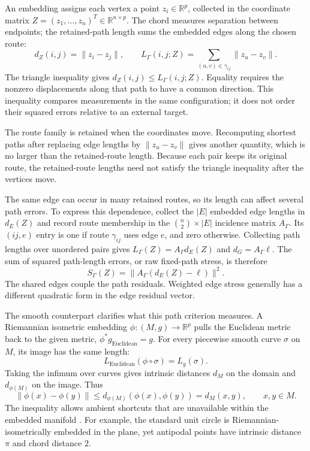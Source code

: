 \documentclass[11pt]{article}
\newcommand{\R}{\mathbb R}
\newcommand{\norm}[1]{\lVert#1\rVert}
\begin{document}
An embedding assigns each vertex a point $z_i\in\R^p$, collected in the
coordinate matrix $Z=(z_1,\ldots,z_n)^T\in\R^{n\times p}$. The chord measures
separation between endpoints; the retained-path length sums the embedded
edges along the chosen route:
\begin{equation}
 d_Z(i,j)=\norm{z_i-z_j},\qquad
 L_\Gamma(i,j;Z)=\sum_{(u,v)\in\gamma_{ij}}\norm{z_u-z_v}.
 \label{eq:chord-path}
\end{equation}
The triangle inequality gives $d_Z(i,j)\le L_\Gamma(i,j;Z)$. Equality requires
the nonzero displacements along that path to have a common direction. This
inequality compares measurements in the same configuration; it does not order
their squared errors relative to an external target.

The route family is retained when the coordinates move. Recomputing shortest
paths after replacing edge lengths by $\norm{z_u-z_v}$ gives another quantity,
which is no larger than the retained-route length. Because each pair keeps
its original route, the retained-route lengths need not satisfy the triangle
inequality after the vertices move.

The same edge can occur in many retained routes, so its length can affect
several path errors. To express this dependence, collect the $|E|$ embedded
edge lengths in $d_E(Z)$ and record route membership in the
$\binom n2\times|E|$ incidence matrix $A_\Gamma$. Its $(ij,e)$ entry is one
if route $\gamma_{ij}$ uses edge $e$, and zero otherwise. Collecting path
lengths over unordered pairs gives $L_\Gamma(Z)=A_\Gamma d_E(Z)$ and
$d_G=A_\Gamma\ell$. The sum of squared path-length errors, or raw fixed-path
stress, is therefore
\begin{equation}
 S_\Gamma(Z)=\norm{A_\Gamma(d_E(Z)-\ell)}^2.
 \label{eq:path-stress}
\end{equation}
The shared edges couple the path residuals. Weighted edge stress generally
has a different quadratic form in the edge residual vector.

The smooth counterpart clarifies what this path criterion measures. A
Riemannian isometric embedding $\phi:(M,g)\to\R^p$ pulls the Euclidean metric
back to the given metric, $\phi^*g_{\mathrm{Euclidean}}=g$. For every piecewise
smooth curve $\sigma$ on $M$, its image has the same length:
\[
 L_{\mathrm{Euclidean}}(\phi\circ\sigma)=L_g(\sigma).
\]
Taking the infimum over curves gives intrinsic distances $d_M$ on the domain
and $d_{\phi(M)}$ on the image. Thus
\[
 \norm{\phi(x)-\phi(y)}\le
 d_{\phi(M)}(\phi(x),\phi(y))=d_M(x,y),\qquad x,y\in M.
\]
The inequality allows ambient shortcuts that are unavailable within the
embedded manifold \citep[Sections 1.2--1.3 and 3.2]{gorodski2022}. For example,
the standard unit circle is Riemannian-isometrically embedded in the plane,
yet antipodal points have intrinsic distance $\pi$ and chord distance $2$.
\end{document}
